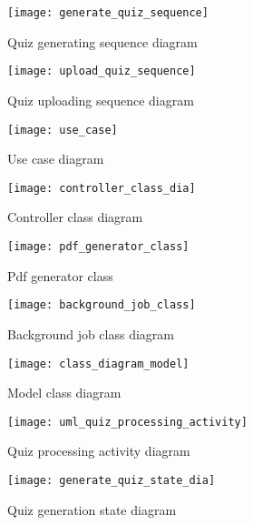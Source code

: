 



\begin{figure}[!ht]
\centering
\texttt{[image: generate\_quiz\_sequence]}
\caption{Quiz generating sequence diagram}\label{}
\end{figure}

\begin{figure}[!ht]
\centering
\texttt{[image: upload\_quiz\_sequence]}
\caption{Quiz uploading sequence diagram}\label{}
\end{figure}

\begin{figure}[!ht]
\centering
\texttt{[image: use\_case]}
\caption{Use case diagram}\label{}
\end{figure}

\begin{figure}[!ht]
\centering
\texttt{[image: controller\_class\_dia]}
\caption{Controller class diagram}\label{}
\end{figure}

\begin{figure}[!ht]
\centering
\texttt{[image: pdf\_generator\_class]}
\caption{Pdf generator class}\label{}
\end{figure}

\begin{figure}[!ht]
\centering
\texttt{[image: background\_job\_class]}
\caption{Background job class diagram}\label{}
\end{figure}

\begin{figure}[!ht]
\centering
\texttt{[image: class\_diagram\_model]}
\caption{Model class diagram}\label{}
\end{figure}

\begin{figure}[!ht]
\centering
\texttt{[image: uml\_quiz\_processing\_activity]}
\caption{Quiz processing activity diagram}\label{}
\end{figure}


\begin{figure}[!ht]
\centering
\texttt{[image: generate\_quiz\_state\_dia]}
\caption{Quiz generation state diagram}\label{}
\end{figure}


